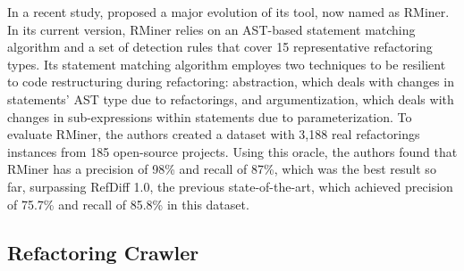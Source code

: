 In a recent study, \cite{tsantalis2018rminer} proposed a major evolution of its tool, now named as RMiner.
In its current version, RMiner relies on an AST-based statement matching algorithm and a set of detection rules that cover 15 representative refactoring types. 
Its statement matching algorithm employes two techniques to be resilient to code restructuring during refactoring: abstraction, which deals with changes in statements' AST type due to refactorings, and argumentization, which deals with changes in sub-expressions within statements due to parameterization.
To evaluate RMiner, the authors created a dataset with 3,188 real refactorings instances from 185 open-source projects. Using this oracle, the authors found that RMiner has a precision of 98\% and recall of 87\%, which was the best result so far, surpassing RefDiff 1.0, the previous state-of-the-art, which achieved precision of 75.7\% and recall of 85.8\% in this dataset.






\subsection{Refactoring Crawler}


